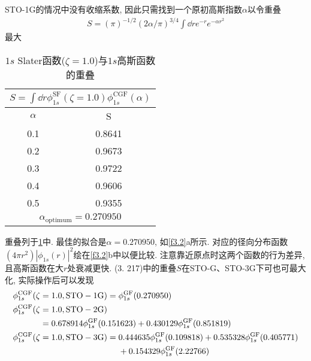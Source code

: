 STO-1G的情况中没有收缩系数, 因此只需找到一个原初高斯指数$\alpha$以令重叠
\begin{align}
	S = (\pi)^{-1/2}(2\alpha/\pi)^{3/4}\int\dd{r}e^{-r}e^{-\alpha r^2}
\end{align}
最大
\begin{table}[H]
	\centering
	\caption{$1s$ Slater函数($\zeta=1.0$)与$1s$高斯函数的重叠}
	\begin{tabular}{cc}
		\multicolumn{2}{c}{$ S=\int\dd{r}\phi_{1s}^\mathrm{SF}(\zeta=1.0)\phi_{1s}^\mathrm{CGF}(\alpha)$} \\ \hline
		$\alpha$ &                                           S                                            \\ \hline
		0.1    &                                         0.8641                                         \\
		0.2    &                                         0.9673                                         \\
		0.3    &                                         0.9722                                         \\
		0.4    &                                         0.9606                                         \\
		0.5    &                                         0.9355                                         \\ \hline
		\multicolumn{2}{c}{$\alpha_\mathrm{optimum}=0.270950$}
	\end{tabular}
	\label{t3.1}
\end{table}
重叠列于\ref{t3.1}中. 
最佳的拟合是$\alpha=0.270950$, 
如\ref{f3.2}a所示. 
对应的径向分布函数$(4\pi r^2)|\phi_{1s}(r)|^2$绘在\ref{f3.2}b中以便比较. 
注意靠近原点时这两个函数的行为差异, 
且高斯函数在大$r$处衰减更快. 
(3.
217)中的重叠$S$在STO-G、STO-3G下可也可最大化, 
实际操作后可以发现
\begin{alignat}{2}
	\label{3.219}
	\phi_{1s}^\mathrm{CGF}(\zeta&=1.0,\mathrm{STO-1G}) = \phi_{1s}^\mathrm{GF}(0.270950)\\
	\phi_{1s}^\mathrm{CGF}(\zeta&=1.0,\mathrm{STO-2G})\notag\\
	&=0.678914\phi_{1s}^\mathrm{GF}(0.151623) +0.430129\phi_{1s}^\mathrm{GF}(0.851819)\\
	\phi_{1s}^\mathrm{CGF}(\zeta&=1.0,\mathrm{STO-3G})=
	\begin{alignedat}[t]{1}&0.444635\phi_{1s}^\mathrm{GF}(0.109818) + 0.535328\phi_{1s}^\mathrm{GF}(0.405771)\\& + 0.154329\phi_{1s}^\mathrm{GF}(2.22766)\end{alignedat}
\end{alignat}


